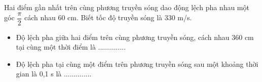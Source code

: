 \begin{vidu}%
Hai điểm gần nhất trên cùng phương truyền sóng dao động lệch pha nhau một góc $\dfrac{\pi}{2}$ cách nhau 60 cm. Biết tốc độ truyền sóng là 330 m/s. 
\begin{itemize}
\item[1.] Độ lệch pha giữa hai điểm trên cùng phương truyền sóng, cách nhau 360 cm tại cùng một thời điểm là ..............
\item[2.] Độ lệch pha tại cùng một điểm trên phương truyền sóng sau một khoảng thời gian là 0,1 s  là ..............
\end{itemize}
\end{vidu} %
